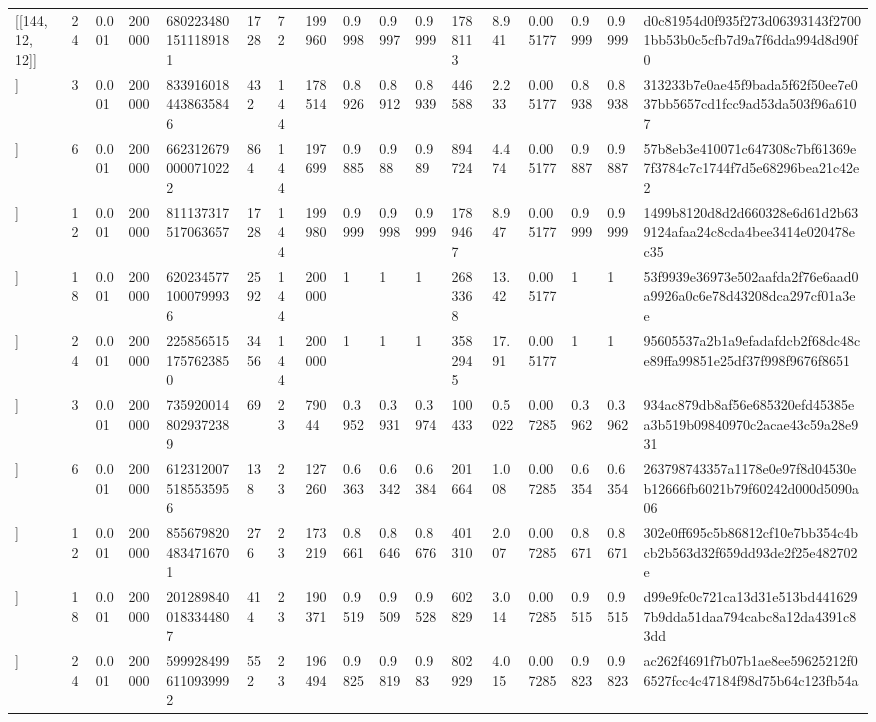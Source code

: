 \begin{tabular}{lllllllllllllllll}
[[144, 12, 12]] & 24 & 0.001 & 200000 & 6802234801511189181 & 1728 & 72 & 199960 & 0.9998 & 0.9997 & 0.9999 & 1788113 & 8.941 & 0.005177 & 0.9999 & 0.9999 & d0c81954d0f935f273d06393143f27001bb53b0c5cfb7d9a7f6dda994d8d90f0 \\
[[288, 12, 18]] & 3 & 0.001 & 200000 & 8339160184438635846 & 432 & 144 & 178514 & 0.8926 & 0.8912 & 0.8939 & 446588 & 2.233 & 0.005177 & 0.8938 & 0.8938 & 313233b7e0ae45f9bada5f62f50ee7e037bb5657cd1fcc9ad53da503f96a6107 \\
[[288, 12, 18]] & 6 & 0.001 & 200000 & 6623126790000710222 & 864 & 144 & 197699 & 0.9885 & 0.988 & 0.989 & 894724 & 4.474 & 0.005177 & 0.9887 & 0.9887 & 57b8eb3e410071c647308c7bf61369e7f3784c7c1744f7d5e68296bea21c42e2 \\
[[288, 12, 18]] & 12 & 0.001 & 200000 & 811137317517063657 & 1728 & 144 & 199980 & 0.9999 & 0.9998 & 0.9999 & 1789467 & 8.947 & 0.005177 & 0.9999 & 0.9999 & 1499b8120d8d2d660328e6d61d2b639124afaa24c8cda4bee3414e020478ec35 \\
[[288, 12, 18]] & 18 & 0.001 & 200000 & 6202345771000799936 & 2592 & 144 & 200000 & 1 & 1 & 1 & 2683368 & 13.42 & 0.005177 & 1 & 1 & 53f9939e36973e502aafda2f76e6aad0a9926a0c6e78d43208dca297cf01a3ee \\
[[288, 12, 18]] & 24 & 0.001 & 200000 & 2258565151757623850 & 3456 & 144 & 200000 & 1 & 1 & 1 & 3582945 & 17.91 & 0.005177 & 1 & 1 & 95605537a2b1a9efadafdcb2f68dc48ce89ffa99851e25df37f998f9676f8651 \\
[[46, 2, 9]] & 3 & 0.001 & 200000 & 7359200148029372389 & 69 & 23 & 79044 & 0.3952 & 0.3931 & 0.3974 & 100433 & 0.5022 & 0.007285 & 0.3962 & 0.3962 & 934ac879db8af56e685320efd45385ea3b519b09840970c2acae43c59a28e931 \\
[[46, 2, 9]] & 6 & 0.001 & 200000 & 6123120075185535956 & 138 & 23 & 127260 & 0.6363 & 0.6342 & 0.6384 & 201664 & 1.008 & 0.007285 & 0.6354 & 0.6354 & 263798743357a1178e0e97f8d04530eb12666fb6021b79f60242d000d5090a06 \\
[[46, 2, 9]] & 12 & 0.001 & 200000 & 8556798204834716701 & 276 & 23 & 173219 & 0.8661 & 0.8646 & 0.8676 & 401310 & 2.007 & 0.007285 & 0.8671 & 0.8671 & 302e0ff695c5b86812cf10e7bb354c4bcb2b563d32f659dd93de2f25e482702e \\
[[46, 2, 9]] & 18 & 0.001 & 200000 & 2012898400183344807 & 414 & 23 & 190371 & 0.9519 & 0.9509 & 0.9528 & 602829 & 3.014 & 0.007285 & 0.9515 & 0.9515 & d99e9fc0c721ca13d31e513bd4416297b9dda51daa794cabc8a12da4391c83dd \\
[[46, 2, 9]] & 24 & 0.001 & 200000 & 5999284996110939992 & 552 & 23 & 196494 & 0.9825 & 0.9819 & 0.983 & 802929 & 4.015 & 0.007285 & 0.9823 & 0.9823 & ac262f4691f7b07b1ae8ee59625212f06527fcc4c47184f98d75b64c123fb54a \\

\end{tabular}
